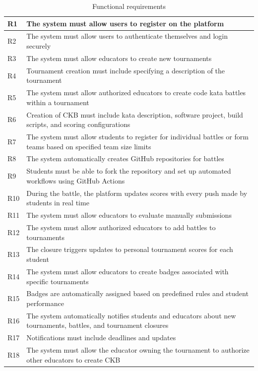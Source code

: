 \begin{table}[H]
    \centering
    \begin{tabular}{|p{0.7cm}|p{15cm}|}
    \hline
        R1 & The system must allow users to register on the platform\\
    \hline
        R2 & The system must allow users to authenticate themselves and login securely\\
    \hline
        R3 & The system must allow educators to create new tournaments\\
    \hline
        R4 & Tournament creation must include specifying a description of the tournament\\
    \hline
        R5 & The system must allow authorized educators to create code kata battles within a tournament\\
    \hline
        R6 & Creation of CKB must include kata description, software project, build scripts, and scoring configurations\\
    \hline
        R7 & The system must allow students to register for individual battles or form teams based on specified team size limits\\
    \hline
        R8 & The system automatically creates GitHub repositories for battles \\
    \hline
        R9 & Students must be able to fork the repository and set up automated workflows using GitHub Actions\\
    \hline
        R10 & During the battle, the platform updates scores with every push made by students in real time\\
    \hline
        R11 & The system must allow educators to evaluate manually submissions\\
        \hline
        R12 & The system must allow authorized educators to add battles to tournaments\\
    \hline
        R13 & The closure triggers updates to personal tournament scores for each student\\
    \hline
        R14 & The system must allow educators to create badges associated with specific tournaments\\
    \hline
        R15 & Badges are automatically assigned based on predefined rules and student performance\\
    \hline
        R16 & The system automatically notifies students and educators about new tournaments, battles, and tournament closures\\
    \hline
        R17 & Notifications must include deadlines and updates\\
    \hline
        R18 & The system must allow the educator owning the tournament to authorize other educators to create CKB \\
    \hline
    \end{tabular}
    \caption{Functional requirements}
    \label{tab:requirements}
\end{table}


